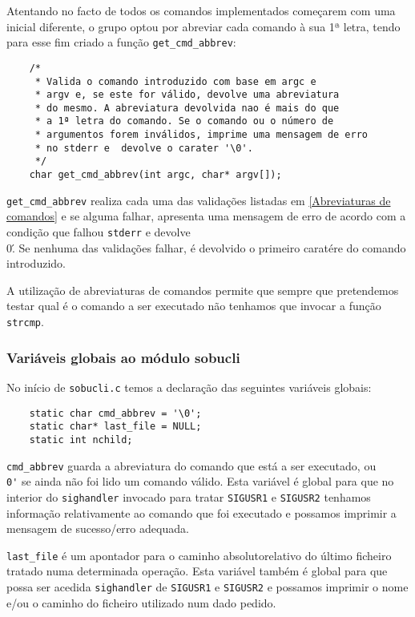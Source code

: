 \documentclass[a4paper,12pt,titlepage,draft,portuguese]{article}
\begin{document}
Atentando no facto de todos os comandos implementados começarem com uma inicial diferente, o grupo optou por abreviar cada comando à sua 1ª letra, tendo para esse fim criado a função \texttt{get\_cmd\_abbrev}:

	\begin{verbatim}
	/* 
 	 * Valida o comando introduzido com base em argc e 
 	 * argv e, se este for válido, devolve uma abreviatura 
 	 * do mesmo. A abreviatura devolvida nao é mais do que
 	 * a 1ª letra do comando. Se o comando ou o número de
 	 * argumentos forem inválidos, imprime uma mensagem de erro 
 	 * no stderr e  devolve o carater '\0'.
 	 */
	char get_cmd_abbrev(int argc, char* argv[]);
	\end{verbatim}
\texttt{get\_cmd\_abbrev} realiza cada uma das validações listadas em \ref{Abreviaturas de comandos} e se alguma falhar, apresenta uma mensagem de erro de acordo com a condição que falhou \texttt{stderr} e devolve \'\\0\'. Se nenhuma das validações falhar, é devolvido o primeiro caratére do comando introduzido. 

A utilização de abreviaturas de comandos permite que sempre que pretendemos testar qual é o comando a ser executado não tenhamos que invocar a função \texttt{strcmp}.

\subsubsection{Variáveis globais ao módulo sobucli}

No início de \texttt{sobucli.c} temos a declaração das seguintes variáveis globais:

	\begin{verbatim}
	static char cmd_abbrev = '\0';
	static char* last_file = NULL;
	static int nchild;
	\end{verbatim}
\texttt{cmd\_abbrev} guarda a abreviatura do comando que está a ser executado, ou \texttt{\'\\0\'} se ainda não foi lido um comando válido. Esta variável é global para que no interior do \texttt{sighandler} invocado para tratar \texttt{SIGUSR1} e \texttt{SIGUSR2} tenhamos informação relativamente ao comando que foi executado e possamos imprimir a mensagem de sucesso/erro adequada. 

\texttt{last\_file} é um apontador para o caminho absoluto\/relativo do último ficheiro tratado numa determinada operação. Esta variável também é global para que possa ser acedida \texttt{sighandler} de \texttt{SIGUSR1} e \texttt{SIGUSR2} e possamos imprimir o nome e/ou o caminho do ficheiro utilizado num dado pedido.
\end{document}
